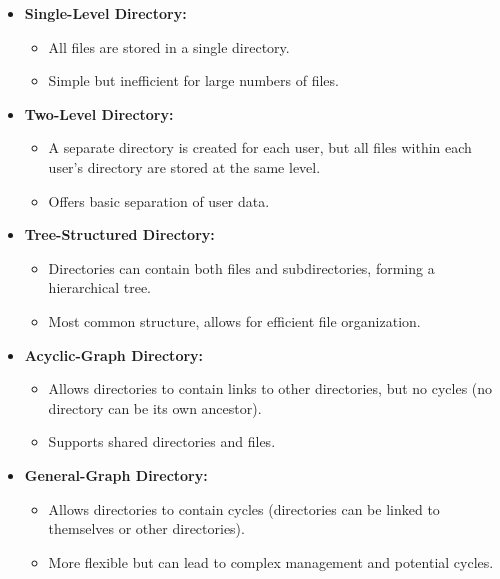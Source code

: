 \begin{itemize}
    \item \textbf{Single-Level Directory:}
    \begin{itemize}
        \item All files are stored in a single directory.
        \item Simple but inefficient for large numbers of files.
    \end{itemize}
    
    \item \textbf{Two-Level Directory:}
    \begin{itemize}
        \item A separate directory is created for each user, but all files within each user's directory are stored at the same level.
        \item Offers basic separation of user data.
    \end{itemize}
    
    \item \textbf{Tree-Structured Directory:}
    \begin{itemize}
        \item Directories can contain both files and subdirectories, forming a hierarchical tree.
        \item Most common structure, allows for efficient file organization.
    \end{itemize}
    
    \item \textbf{Acyclic-Graph Directory:}
    \begin{itemize}
        \item Allows directories to contain links to other directories, but no cycles (no directory can be its own ancestor).
        \item Supports shared directories and files.
    \end{itemize}
    
    \item \textbf{General-Graph Directory:}
    \begin{itemize}
        \item Allows directories to contain cycles (directories can be linked to themselves or other directories).
        \item More flexible but can lead to complex management and potential cycles.
    \end{itemize}
\end{itemize}



